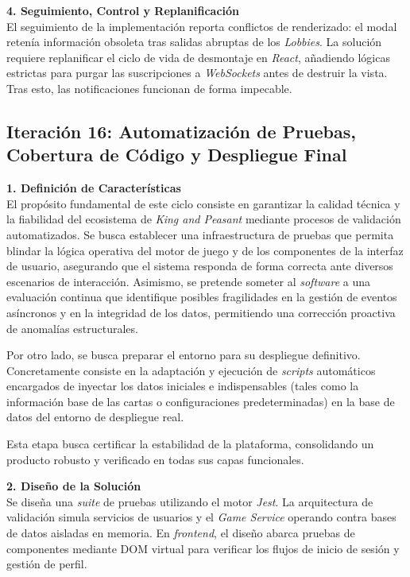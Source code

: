 \textbf{4. Seguimiento, Control y Replanificación} \\
El seguimiento de la implementación reporta conflictos de renderizado: el modal retenía información obsoleta tras salidas abruptas de los \textit{Lobbies}. La solución requiere replanificar el ciclo de vida de desmontaje en \textit{React}, añadiendo lógicas estrictas para purgar las suscripciones a \textit{WebSockets} antes de destruir la vista. Tras esto, las notificaciones funcionan de forma impecable.

\subsection{Iteración 16: Automatización de Pruebas, Cobertura de Código y Despliegue Final}

\textbf{1. Definición de Características} \\
El propósito fundamental de este ciclo consiste en garantizar la calidad técnica y la fiabilidad del ecosistema de \textit{King and Peasant} mediante procesos de validación automatizados. Se busca establecer una infraestructura de pruebas que permita blindar la lógica operativa del motor de juego y de los componentes de la interfaz de usuario, asegurando que el sistema responda de forma correcta ante diversos escenarios de interacción. Asimismo, se pretende someter al \textit{software} a una evaluación continua que identifique posibles fragilidades en la gestión de eventos asíncronos y en la integridad de los datos, permitiendo una corrección proactiva de anomalías estructurales.

Por otro lado, se busca preparar el entorno para su despliegue definitivo.
Concretamente consiste en la adaptación y ejecución de \textit{scripts} automáticos encargados de inyectar los datos iniciales e indispensables (tales como la información base de las cartas o configuraciones predeterminadas) en la base de datos del entorno de despliegue real.

Esta etapa busca certificar la estabilidad de la plataforma, consolidando un producto robusto y verificado en todas sus capas funcionales.

\textbf{2. Diseño de la Solución} \\
Se diseña una \textit{suite} de pruebas utilizando el motor \textit{Jest}. La arquitectura de validación simula servicios de usuarios y el \textit{Game Service} operando contra bases de datos aisladas en memoria. En \textit{frontend}, el diseño abarca pruebas de componentes mediante DOM virtual para verificar los flujos de inicio de sesión y gestión de perfil.

